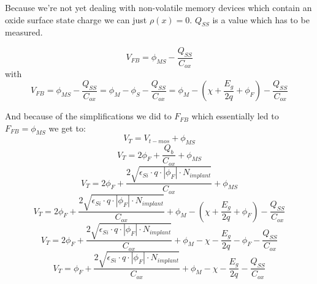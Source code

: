 Because we're not yet dealing with non-volatile memory devices which contain an oxide surface state charge we can just $\rho(x)=0$.
$Q_{SS}$ is a value which has to be measured.

\begin{equation}
V_{FB}
=
\phi_{MS} - \frac{Q_{SS}}{C_{ox}}
\end{equation}
with
\begin{equation}
V_{FB}
=
\phi_{MS} - \frac{Q_{SS}}{C_{ox}}
=
\phi_{M} - \phi_{S} - \frac{Q_{SS}}{C_{ox}}
=
\phi_{M} -  \left(\chi + \frac{E_g}{2 q} + \phi_F \right) - \frac{Q_{SS}}{C_{ox}}
\end{equation}

And because of the simplifications we did to $F_{FB}$ which essentially led to $F_{FB}=\phi_{MS}$ we get to:
\begin{equation}
V_T = V_{t-mos} + \phi_{MS}
\end{equation}
\begin{equation}
V_T = 2 \phi_F + \frac{Q_b}{C_{ox}} + \phi_{MS}
\end{equation}
\begin{equation}
V_T = 2 \phi_F + \frac{2 \sqrt{\epsilon_{Si}\cdot q\cdot \left| \phi_F \right| \cdot N_{implant} }}{C_{ox}} + \phi_{MS}
\end{equation}
\begin{equation}
V_T = 2 \phi_F + \frac{2 \sqrt{\epsilon_{Si}\cdot q\cdot \left| \phi_F \right| \cdot N_{implant} }}{C_{ox}} + \phi_{M} -  \left(\chi + \frac{E_g}{2 q} + \phi_F \right) - \frac{Q_{SS}}{C_{ox}}
\end{equation}
\begin{equation}
V_T = 2 \phi_F + \frac{2 \sqrt{\epsilon_{Si}\cdot q\cdot \left| \phi_F \right| \cdot N_{implant} }}{C_{ox}} + \phi_{M} -  \chi - \frac{E_g}{2 q} - \phi_F - \frac{Q_{SS}}{C_{ox}}
\end{equation}
\begin{equation}
V_T = \phi_F + \frac{2 \sqrt{\epsilon_{Si}\cdot q\cdot \left| \phi_F \right| \cdot N_{implant} }}{C_{ox}} + \phi_{M} -  \chi - \frac{E_g}{2 q} - \frac{Q_{SS}}{C_{ox}}
\end{equation}

